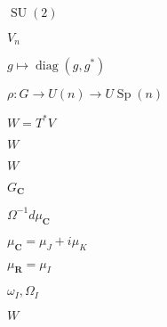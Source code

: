 \begin{preview}
\setcounter{equation}{0}%
\( \operatorname{SU}(2) \)
\end{preview}

\begin{preview}
\setcounter{equation}{0}%
\( V_n \)
\end{preview}

\begin{preview}
\setcounter{equation}{0}%
\( g \mapsto \operatorname{diag}(g,g^{*}) \)
\end{preview}

\begin{preview}
\setcounter{equation}{0}%
\( \rho : G \to U(n) \to U \operatorname{Sp}(n) \)
\end{preview}

\begin{preview}
\setcounter{equation}{0}%
\( W = T^{*}V \)
\end{preview}

\begin{preview}
\setcounter{equation}{0}%
\( W \)
\end{preview}

\begin{preview}
\setcounter{equation}{0}%
\( W \)
\end{preview}

\begin{preview}
\setcounter{equation}{0}%
\( G_{\mathbf{C}} \)
\end{preview}

\begin{preview}
\setcounter{equation}{0}%
\( \Omega ^{-1} d \mu_{\mathbf{C}} \)
\end{preview}

\begin{preview}
\setcounter{equation}{0}%
\( \mu_{\mathbf{C}} = \mu_J + i \mu_K \)
\end{preview}

\begin{preview}
\setcounter{equation}{0}%
\( \mu_{ \mathbf{R}} = \mu_I \)
\end{preview}

\begin{preview}
\setcounter{equation}{0}%
\( \omega_I , \Omega_I \)
\end{preview}

\begin{preview}
\setcounter{equation}{0}%
\( W \)
\end{preview}


